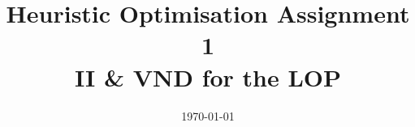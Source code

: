 \documentclass[a4paper, 11pt]{article}
\title{
	\textbf{Heuristic Optimisation Assignment 1\\ \Large{II \& VND for the LOP}}\\
}
\date{\today}
\begin{document}
\maketitle
\newpage

\tableofcontents
\newpage







\begin{thebibliography}{5}
\end{thebibliography}
\end{document}

